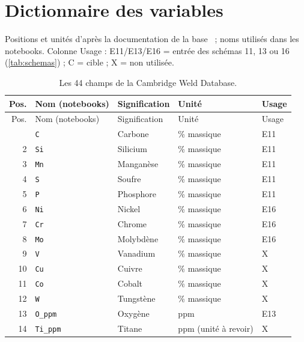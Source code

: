 \section{Dictionnaire des variables}
\label{annexe:variables}

Positions et unités d'après la documentation de la base~\cite{cool_welddb} ; noms
utilisés dans les notebooks. Colonne \og Usage \fg{} : E11/E13/E16 = entrée des
schémas 11, 13 ou 16 (\cref{tab:schemas}) ; C = cible ; X = non utilisée.

{\footnotesize
\begin{longtable}{@{}r l >{\raggedright\arraybackslash}p{4.7cm} >{\raggedright\arraybackslash}p{2.6cm} >{\raggedright\arraybackslash}p{2.4cm}@{}}
\caption{Les 44 champs de la Cambridge Weld Database.}\label{tab:dictionnaire}\\
\toprule
Pos. & Nom (notebooks) & Signification & Unité & Usage \\
\midrule
\endfirsthead
\toprule
Pos. & Nom (notebooks) & Signification & Unité & Usage \\
\midrule
\endhead
\bottomrule
\endfoot
1  & \texttt{C}  & Carbone   & \% massique & E11 \\
2  & \texttt{Si} & Silicium  & \% massique & E11 \\
3  & \texttt{Mn} & Manganèse & \% massique & E11 \\
4  & \texttt{S}  & Soufre    & \% massique & E11 \\
5  & \texttt{P}  & Phosphore & \% massique & E11 \\
6  & \texttt{Ni} & Nickel    & \% massique & E16 \\
7  & \texttt{Cr} & Chrome    & \% massique & E16 \\
8  & \texttt{Mo} & Molybdène & \% massique & E16 \\
9  & \texttt{V}  & Vanadium  & \% massique & X \\
10 & \texttt{Cu} & Cuivre    & \% massique & X \\
11 & \texttt{Co} & Cobalt    & \% massique & X \\
12 & \texttt{W}  & Tungstène & \% massique & X \\
13 & \texttt{O\_ppm}  & Oxygène   & ppm & E13 \\
14 & \texttt{Ti\_ppm} & Titane    & ppm (unité à revoir) & X \\

\end{longtable}}
